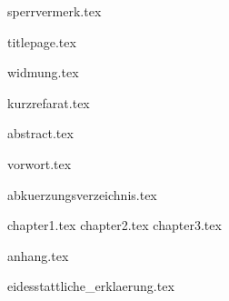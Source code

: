 \documentclass[a4paper,12pt,twoside]{scrreprt}
\begin{document}
{sperrvermerk.tex}

\cleardoublepage
{titlepage.tex}

\newpage
{widmung.tex}

\newpage
{kurzrefarat.tex}

\newpage
{abstract.tex}

\newpage
{vorwort.tex}

\cleardoublepage
\tableofcontents

\clearpage
{}
{}
\listoffigures

\clearpage
{}
{}
\listoftables

\clearpage
{abkuerzungsverzeichnis.tex}

{chapter1.tex}
{chapter2.tex}
{chapter3.tex}

\clearpage
{}
{}
\printbibliography

{anhang.tex}

{eidesstattliche_erklaerung.tex}
\end{document}

